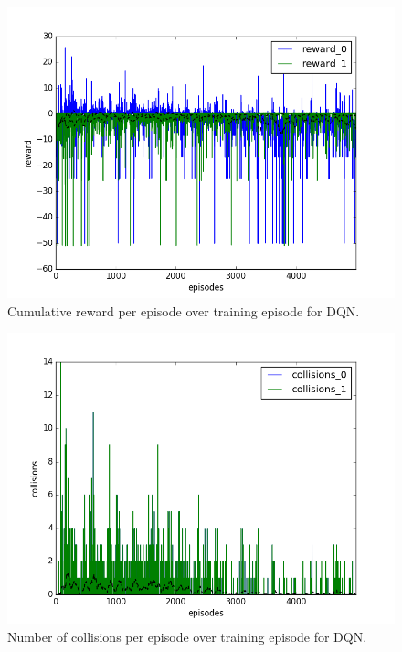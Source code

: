 \begin{figure}[h]
  \centering
  \includegraphics[trim=10 10 10 10,clip,width=\figscale\linewidth]
  {../results/dqn_1vs1/reward.png}
  \caption{Cumulative reward per episode over training episode for DQN.}
  \label{fig:dqn-1vs1}
\end{figure}
\FloatBarrier


\begin{figure}[h]
  \centering
  \includegraphics[trim=10 10 10 10,clip,width=\figscale\linewidth]
  {../results/dqn_1vs1/collisions.png}
  \caption{Number of collisions per episode over training episode for DQN.}
  \label{fig:dqn-1vs1}
\end{figure}
\FloatBarrier


